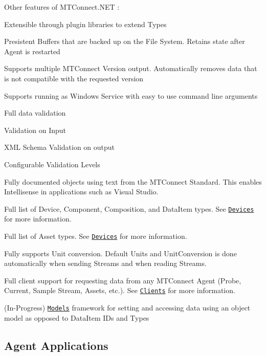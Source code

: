Other features of M\+T\+Connect.\+N\+ET \+:
\begin{DoxyItemize}
\item Extensible through plugin libraries to extend Types
\item Presistent Buffers that are backed up on the File System. Retains state after Agent is restarted
\item Supports multiple M\+T\+Connect Version output. Automatically removes data that is not compatible with the requested version
\item Supports running as Windows Service with easy to use command line arguments
\item Full data validation
\begin{DoxyItemize}
\item Validation on Input
\item X\+ML Schema Validation on output
\item Configurable Validation Levels
\end{DoxyItemize}
\item Fully documented objects using text from the M\+T\+Connect Standard. This enables Intellisense in applications such as Visual Studio.
\item Full list of Device, Component, Composition, and Data\+Item types. See \href{https://github.com/TrakHound/MTConnect.NET/tree/master/src/MTConnect.NET-Common/Devices}{\tt Devices} for more information.
\item Full list of Asset types. See \href{https://github.com/TrakHound/MTConnect.NET/tree/master/src/MTConnect.NET-Common/Assets}{\tt Devices} for more information.
\item Fully supports Unit conversion. Default Units and Unit\+Conversion is done automatically when sending Streams and when reading Streams.
\item Full client support for requesting data from any M\+T\+Connect Agent (Probe, Current, Sample Stream, Assets, etc.). See \href{https://github.com/TrakHound/MTConnect.NET/tree/master/src/MTConnect.NET-HTTP/Clients/Rest}{\tt Clients} for more information.
\item (In-\/\+Progress) \href{https://github.com/TrakHound/MTConnect.NET/tree/master/src/MTConnect.NET-Models/Models}{\tt Models} framework for setting and accessing data using an object model as opposed to Data\+Item ID\textquotesingle{}s and Types
\end{DoxyItemize}

\subsection*{Agent Applications}

